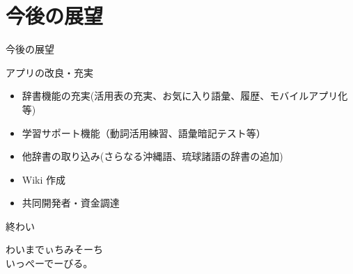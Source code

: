 \documentclass[14pt]{beamer}
\begin{document}
\section{今後の展望}
\begin{frame}{今後の展望}
  \begin{block}{アプリの改良・充実}
    \begin{itemize}
    \item 辞書機能の充実(活用表の充実、お気に入り語彙、履歴、モバイルアプリ化等)
    \item 学習サポート機能（動詞活用練習、語彙暗記テスト等）
    \item 他辞書の取り込み(さらなる沖縄語、琉球諸語の辞書の追加)
    \item Wiki 作成
    \item 共同開発者・資金調達
    \end{itemize}
  \end{block}
\end{frame}
\begin{frame}{終わい}
  \begin{center}
  \LARGE{わいまでぃちみそーち\\いっぺーでーびる。}
  \end{center}
\end{frame}
\end{document}
